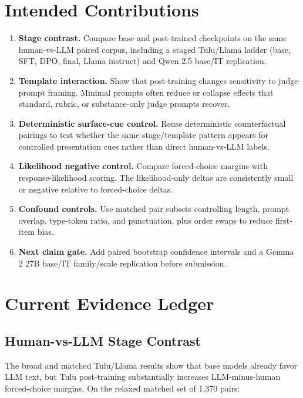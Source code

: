 \documentclass[11pt]{article}
\begin{document}
\section{Intended Contributions}

\begin{enumerate}[leftmargin=1.5em]
\item \textbf{Stage contrast.} Compare base and post-trained checkpoints on
the same human-vs-LLM paired corpus, including a staged Tulu/Llama ladder
(base, SFT, DPO, final, Llama instruct) and Qwen 2.5 base/IT replication.

\item \textbf{Template interaction.} Show that post-training changes sensitivity
to judge prompt framing. Minimal prompts often reduce or collapse effects that
standard, rubric, or substance-only judge prompts recover.

\item \textbf{Deterministic surface-cue control.} Reuse deterministic
counterfactual pairings to test whether the same stage/template pattern appears
for controlled presentation cues rather than direct human-vs-LLM labels.

\item \textbf{Likelihood negative control.} Compare forced-choice margins with
response-likelihood scoring. The likelihood-only deltas are consistently small
or negative relative to forced-choice deltas.

\item \textbf{Confound controls.} Use matched pair subsets controlling length,
prompt overlap, type-token ratio, and punctuation, plus order swaps to reduce
first-item bias.

\item \textbf{Next claim gate.} Add paired bootstrap confidence intervals and a
Gemma 2 27B base/IT family/scale replication before submission.
\end{enumerate}

\section{Current Evidence Ledger}

\subsection{Human-vs-LLM Stage Contrast}

The broad and matched Tulu/Llama results show that base models already favor
LLM text, but Tulu post-training substantially increases LLM-minus-human
forced-choice margins. On the relaxed matched set of 1,370 pairs:
\end{document}

